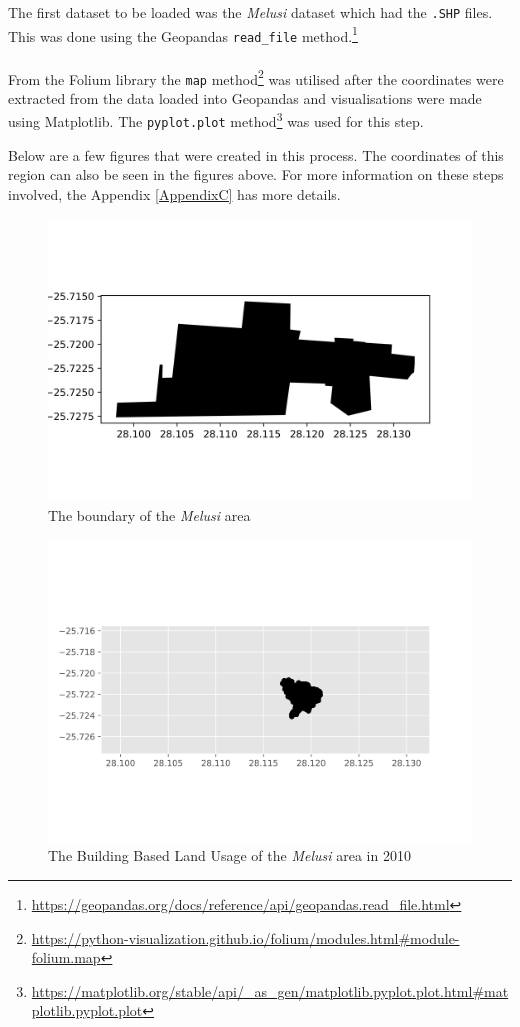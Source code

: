 The first dataset to be loaded was the \textit{Melusi} dataset which had the \texttt{.SHP} files. This was done using the Geopandas \texttt{read\_file} method.\footnote{\url{https://geopandas.org/docs/reference/api/geopandas.read_file.html}}\\\\
From the Folium library the \texttt{map} method\footnote{\url{https://python-visualization.github.io/folium/modules.html\#module-folium.map}} was utilised after the coordinates were extracted from the data loaded into Geopandas and visualisations were made using Matplotlib. The \texttt{pyplot.plot} method\footnote{\url{https://matplotlib.org/stable/api/_as_gen/matplotlib.pyplot.plot.html\#matplotlib.pyplot.plot}} was used for this step.

Below are a few figures that were created in this process. The coordinates of this region can also be seen in the figures above.
For more information on these steps involved, the Appendix \ref{AppendixC} has more details.
\begin{figure}[H]
\centering
\includegraphics[width=1\textwidth]{Figures/Chapter3/MelusiArea}
\caption{The boundary of the \textit{Melusi} area}
\end{figure}
\begin{figure}[H]
\centering
\includegraphics[width=1\textwidth]{Figures/Chapter3/Melusi2010}
\caption{The Building Based Land Usage of the \textit{Melusi} area in 2010}
\label{fig:mel2010}
\end{figure}
